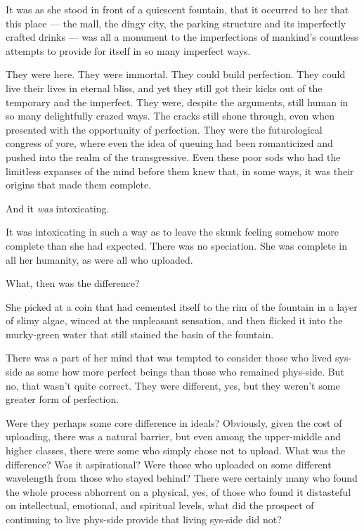 It was as she stood in front of a quiescent fountain, that it occurred to her that this place — the mall, the dingy city, the parking structure and its imperfectly crafted drinks — was all a monument to the imperfections of mankind's countless attempts to provide for itself in so many imperfect ways.

They were here. They were immortal. They could build perfection. They could live their lives in eternal bliss, and yet they still got their kicks out of the temporary and the imperfect. They were, despite the arguments, still human in so many delightfully crazed ways. The cracks still shone through, even when presented with the opportunity of perfection. They were the futurological congress of yore, where even the idea of queuing had been romanticized and pushed into the realm of the transgressive. Even these poor sods who had the limitless expanses of the mind before them knew that, in some ways, it was their origins that made them complete.

And it \emph{was} intoxicating.

It was intoxicating in such a way as to leave the skunk feeling somehow more complete than she had expected. There was no speciation. She was complete in all her humanity, as were all who uploaded.

What, then was the difference?

She picked at a coin that had cemented itself to the rim of the fountain in a layer of slimy algae, winced at the unpleasant sensation, and then flicked it into the murky-green water that still stained the basin of the fountain.

There was a part of her mind that was tempted to consider those who lived sys-side as some how more perfect beings than those who remained phys-side. But no, that wasn't quite correct. They were different, yes, but they weren't some greater form of perfection.

Were they perhaps some core difference in ideals? Obviously, given the cost of uploading, there was a natural barrier, but even among the upper-middle and higher classes, there were some who simply chose not to upload. What was the difference? Was it aspirational? Were those who uploaded on some different wavelength from those who stayed behind? There were certainly many who found the whole process abhorrent on a physical, yes, of those who found it distasteful on intellectual, emotional, and spiritual levels, what did the prospect of continuing to live phys-side provide that living sys-side did not?


